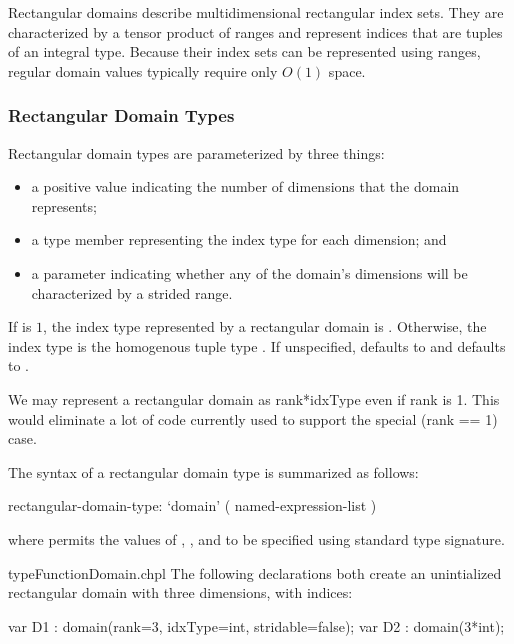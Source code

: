 Rectangular domains describe multidimensional rectangular index sets.  They are
characterized by a tensor product of ranges and represent indices that are
tuples of an integral type.  Because their index sets can be represented using
ranges, regular domain values typically require only $O(1)$ space.

\subsubsection{Rectangular Domain Types}

Rectangular domain types are parameterized by three things:
\begin{itemize}
\item {} a positive  value indicating the number
of dimensions that the domain represents;
\item {} a type member representing the index type for
each dimension; and
\item {} a  parameter indicating whether
any of the domain's dimensions will be characterized by a strided
range.
\end{itemize}
If  is $1$, the index type represented by a rectangular
domain is .  Otherwise, the index type is the homogenous
tuple type .
If unspecified,  defaults
to  and  defaults to .

\begin{openissue}
We may represent a rectangular domain as rank*idxType even if rank is 1.  This
would eliminate a lot of code currently used to support the special (rank == 1) case.
\end{openissue}

The syntax of a rectangular domain type is summarized as follows:
\begin{syntax}
rectangular-domain-type:
  `domain' ( named-expression-list )
\end{syntax}

\noindent where  permits the values of
, , and  to be specified
using standard type signature.

\begin{chapelexample}{typeFunctionDomain.chpl}
The following declarations both create an unintialized rectangular domain with three dimensions, with  indices:
\begin{chapel}
var D1 : domain(rank=3, idxType=int, stridable=false);
var D2 : domain(3*int);
\end{chapel}
\begin{chapeloutput}
\end{chapeloutput}
\end{chapelexample}

